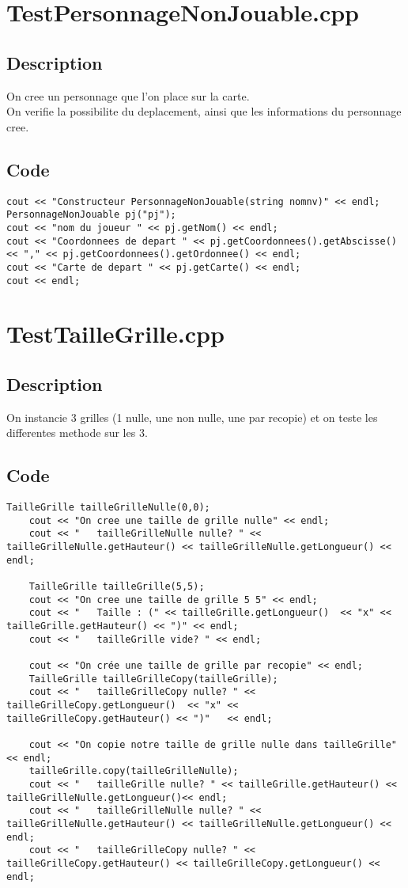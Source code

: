     \section{TestPersonnageNonJouable.cpp}
        \subsection{Description}
            On cree un personnage que l'on place sur la carte.\\
            On verifie la possibilite du deplacement, ainsi que les informations du personnage cree.
        \subsection{Code}
\begin{lstlisting}	
cout << "Constructeur PersonnageNonJouable(string nomnv)" << endl;
PersonnageNonJouable pj("pj");
cout << "nom du joueur " << pj.getNom() << endl;
cout << "Coordonnees de depart " << pj.getCoordonnees().getAbscisse() << "," << pj.getCoordonnees().getOrdonnee() << endl;
cout << "Carte de depart " << pj.getCarte() << endl;
cout << endl;
	\end{lstlisting}
    \section{TestTailleGrille.cpp}
        \subsection{Description}
            On instancie 3 grilles (1 nulle, une non nulle, une par recopie) et on teste les differentes methode sur les 3.
        \subsection{Code}
\begin{lstlisting}
TailleGrille tailleGrilleNulle(0,0);
    cout << "On cree une taille de grille nulle" << endl;
    cout << "   tailleGrilleNulle nulle? " << tailleGrilleNulle.getHauteur() << tailleGrilleNulle.getLongueur() << endl;

    TailleGrille tailleGrille(5,5);
    cout << "On cree une taille de grille 5 5" << endl;
    cout << "   Taille : (" << tailleGrille.getLongueur()  << "x" << tailleGrille.getHauteur() << ")" << endl;
    cout << "   tailleGrille vide? " << endl;

    cout << "On crée une taille de grille par recopie" << endl;
    TailleGrille tailleGrilleCopy(tailleGrille);
    cout << "   tailleGrilleCopy nulle? " << tailleGrilleCopy.getLongueur()  << "x" << tailleGrilleCopy.getHauteur() << ")"   << endl;

    cout << "On copie notre taille de grille nulle dans tailleGrille" << endl;
    tailleGrille.copy(tailleGrilleNulle);
    cout << "   tailleGrille nulle? " << tailleGrille.getHauteur() << tailleGrilleNulle.getLongueur()<< endl;
    cout << "   tailleGrilleNulle nulle? " << tailleGrilleNulle.getHauteur() << tailleGrilleNulle.getLongueur() << endl;
    cout << "   tailleGrilleCopy nulle? " << tailleGrilleCopy.getHauteur() << tailleGrilleCopy.getLongueur() << endl;
	\end{lstlisting}
